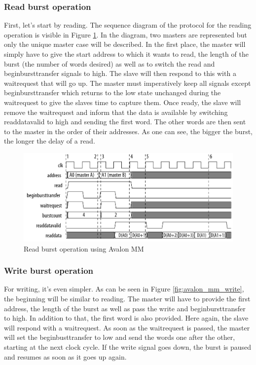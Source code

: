 \documentclass[12pt]{article}
\begin{document}
\subsubsection{Read burst operation}

First, let's start by reading. The sequence diagram of the protocol for the reading operation is visible in Figure \ref{fig:avalon_mm_read}. In the diagram, two masters are represented but only the unique master case will be described. In the first place, the master will simply have to give the start address to which it wants to read, the length of the burst (the number of words desired) as well as to switch the read and beginbursttransfer signals to high. The slave will then respond to this with a waitrequest that will go up. The master must imperatively keep all signals except beginbursttransfer which returns to the low state unchanged during the waitrequest to give the slaves time to capture them. Once ready, the slave will remove the waitrequest and inform that the data is available by switching readdatavalid to high and sending the first word. The other words are then sent to the master in the order of their addresses. As one can see, the bigger the burst, the longer the delay of a read.

\begin{figure}[ht!]
  \center
  \includegraphics[width=\linewidth]{"res/board/avalon_mm_read.png"}
  \caption{Read burst operation using Avalon MM}
  \label{fig:avalon_mm_read}
\end{figure}

\subsubsection{Write burst operation}

For writing, it's even simpler. As can be seen in Figure \ref{fig:avalon_mm_write}, the beginning will be similar to reading. The master will have to provide the first address, the length of the burst as well as pass the write and beginbursttransfer to high. In addition to that, the first word is also provided. Here again, the slave will respond with a waitrequest. As soon as the waitrequest is passed, the master will set the beginbusttransfer to low and send the words one after the other, starting at the next clock cycle. If the write signal goes down, the burst is paused and resumes as soon as it goes up again.
\end{document}
